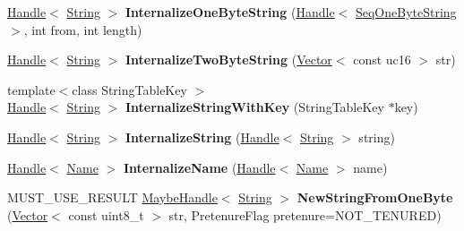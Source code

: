 \begin{DoxyCompactItemize}
\item 
\hyperlink{classv8_1_1internal_1_1_handle}{Handle}$<$ \hyperlink{classv8_1_1internal_1_1_string}{String} $>$ {\bfseries Internalize\+One\+Byte\+String} (\hyperlink{classv8_1_1internal_1_1_handle}{Handle}$<$ \hyperlink{classv8_1_1internal_1_1_seq_one_byte_string}{Seq\+One\+Byte\+String} $>$, int from, int length)\hypertarget{classv8_1_1internal_1_1_factory_aebc9d867cc6e11a4b6d9c89bae35a8c7}{}\label{classv8_1_1internal_1_1_factory_aebc9d867cc6e11a4b6d9c89bae35a8c7}

\item 
\hyperlink{classv8_1_1internal_1_1_handle}{Handle}$<$ \hyperlink{classv8_1_1internal_1_1_string}{String} $>$ {\bfseries Internalize\+Two\+Byte\+String} (\hyperlink{classv8_1_1internal_1_1_vector}{Vector}$<$ const uc16 $>$ str)\hypertarget{classv8_1_1internal_1_1_factory_a6b528a4e070f830ec53819b8cdb15756}{}\label{classv8_1_1internal_1_1_factory_a6b528a4e070f830ec53819b8cdb15756}

\item 
{\footnotesize template$<$class String\+Table\+Key $>$ }\\\hyperlink{classv8_1_1internal_1_1_handle}{Handle}$<$ \hyperlink{classv8_1_1internal_1_1_string}{String} $>$ {\bfseries Internalize\+String\+With\+Key} (String\+Table\+Key $\ast$key)\hypertarget{classv8_1_1internal_1_1_factory_a4917d7f1755493f548430aad37c0ce5a}{}\label{classv8_1_1internal_1_1_factory_a4917d7f1755493f548430aad37c0ce5a}

\item 
\hyperlink{classv8_1_1internal_1_1_handle}{Handle}$<$ \hyperlink{classv8_1_1internal_1_1_string}{String} $>$ {\bfseries Internalize\+String} (\hyperlink{classv8_1_1internal_1_1_handle}{Handle}$<$ \hyperlink{classv8_1_1internal_1_1_string}{String} $>$ string)\hypertarget{classv8_1_1internal_1_1_factory_a002601f4bfb7e50bfafc8db522cd7bba}{}\label{classv8_1_1internal_1_1_factory_a002601f4bfb7e50bfafc8db522cd7bba}

\item 
\hyperlink{classv8_1_1internal_1_1_handle}{Handle}$<$ \hyperlink{classv8_1_1internal_1_1_name}{Name} $>$ {\bfseries Internalize\+Name} (\hyperlink{classv8_1_1internal_1_1_handle}{Handle}$<$ \hyperlink{classv8_1_1internal_1_1_name}{Name} $>$ name)\hypertarget{classv8_1_1internal_1_1_factory_a4ad3904332611ef75953a77ac625e7cb}{}\label{classv8_1_1internal_1_1_factory_a4ad3904332611ef75953a77ac625e7cb}

\item 
M\+U\+S\+T\+\_\+\+U\+S\+E\+\_\+\+R\+E\+S\+U\+LT \hyperlink{classv8_1_1internal_1_1_maybe_handle}{Maybe\+Handle}$<$ \hyperlink{classv8_1_1internal_1_1_string}{String} $>$ {\bfseries New\+String\+From\+One\+Byte} (\hyperlink{classv8_1_1internal_1_1_vector}{Vector}$<$ const uint8\+\_\+t $>$ str, Pretenure\+Flag pretenure=N\+O\+T\+\_\+\+T\+E\+N\+U\+R\+ED)\hypertarget{classv8_1_1internal_1_1_factory_a89de8fdfb8c5f0d5f787adcde8e0e405}{}\label{classv8_1_1internal_1_1_factory_a89de8fdfb8c5f0d5f787adcde8e0e405}


\end{DoxyCompactItemize}
